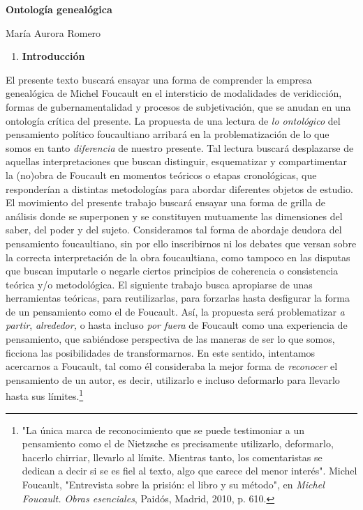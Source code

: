 \documentclass{book}
\begin{document}
\textbf{Ontología genealógica}

María Aurora Romero

\begin{enumerate}
\def\labelenumi{\arabic{enumi}.}
\item
  \textbf{Introducción}
\end{enumerate}

El presente texto buscará ensayar una forma de comprender la empresa
genealógica de Michel Foucault en el intersticio de modalidades de
veridicción, formas de gubernamentalidad y procesos de subjetivación,
que se anudan en una ontología crítica del presente. La propuesta de una
lectura de \emph{lo ontológico} del pensamiento político foucaultiano
arribará en la problematización de lo que somos en tanto
\emph{diferencia} de nuestro presente. Tal lectura buscará desplazarse
de aquellas interpretaciones que buscan distinguir, esquematizar y
compartimentar la (no)obra de Foucault en momentos teóricos o etapas
cronológicas, que responderían a distintas metodologías para abordar
diferentes objetos de estudio. El movimiento del presente trabajo
buscará ensayar una forma de grilla de análisis donde se superponen y se
constituyen mutuamente las dimensiones del saber, del poder y del
sujeto. Consideramos tal forma de abordaje deudora del pensamiento
foucaultiano, sin por ello inscribirnos ni los debates que versan sobre
la correcta interpretación de la obra foucaultiana, como tampoco en las
disputas que buscan imputarle o negarle ciertos principios de coherencia
o consistencia teórica y/o metodológica. El siguiente trabajo busca
apropiarse de unas herramientas teóricas, para reutilizarlas, para
forzarlas hasta desfigurar la forma de un pensamiento como el de
Foucault. Así, la propuesta será problematizar \emph{a partir},
\emph{alrededor,} o hasta incluso \emph{por fuera} de Foucault como una
experiencia de pensamiento, que sabiéndose perspectiva de las maneras de
ser lo que somos, ficciona las posibilidades de transformarnos. En este
sentido, intentamos acercarnos a Foucault, tal como él consideraba la
mejor forma de \emph{reconocer} el pensamiento de un autor, es decir,
utilizarlo e incluso deformarlo para llevarlo hasta sus
límites.\footnote{"La única marca de reconocimiento que se puede
  testimoniar a un pensamiento como el de Nietzsche es precisamente
  utilizarlo, deformarlo, hacerlo chirriar, llevarlo al límite. Mientras
  tanto, los comentaristas se dedican a decir si se es fiel al texto,
  algo que carece del menor interés". Michel Foucault, "Entrevista sobre
  la prisión: el libro y su método", en \emph{Michel Foucault. Obras
  esenciales}, Paidós, Madrid, 2010, p. 610.}
\end{document}
